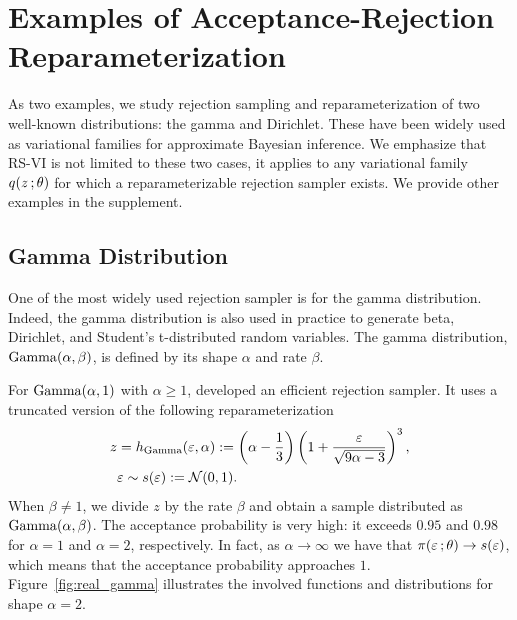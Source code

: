 
\section{Examples of Acceptance-Rejection Reparameterization}
\label{sec:examples}

As two examples, we study rejection sampling and reparameterization of two well-known distributions: the gamma and Dirichlet. These have been widely used as variational families for approximate Bayesian inference. %
We emphasize that \gls{RS-VI} is not limited to these two cases, it applies to any variational family $q(z\, ;\theta)$ for which a reparameterizable rejection sampler exists. We provide other examples in the supplement.


\subsection{Gamma Distribution}
\label{subsec:gamma_example}

One of the most widely used rejection sampler is for the gamma distribution. Indeed, the gamma distribution is also used in practice to generate \eg beta, Dirichlet, and Student's t-distributed random variables. The gamma distribution, $\operatorname*{Gamma}(\alpha,\beta)$, is defined by its shape $\alpha$ and rate $\beta$.

For $\operatorname*{Gamma}(\alpha,1)$ with $\alpha \geq 1$, \citet{Marsaglia:2000} developed an efficient rejection sampler. It uses a truncated version of the following reparameterization
\begin{align}
\label{eq:marsaglia}
  z &= h_{\gam}(\eps,\alpha) \eqdef \left(\alpha-\frac{1}{3}\right)\left(1+\frac{\eps}{\sqrt{9\alpha-3}}\right)^3, \\
\nonumber &\eps \sim s(\eps) \eqdef \N(0,1).%
\end{align}
When $\beta \neq 1$, we divide $z$ by the rate $\beta$ and obtain a sample distributed as $\operatorname*{Gamma}(\alpha,\beta)$. The acceptance probability is very high: it exceeds $0.95$ and $0.98$ for $\alpha=1$ and $\alpha=2$, respectively. In fact, as $\alpha \to \infty$ we have that $\pi(\varepsilon\, ;\theta) \to s(\varepsilon)$, which means that the acceptance probability approaches $1$. Figure~\ref{fig:real_gamma} illustrates the involved functions and distributions for shape $\alpha=2$.


